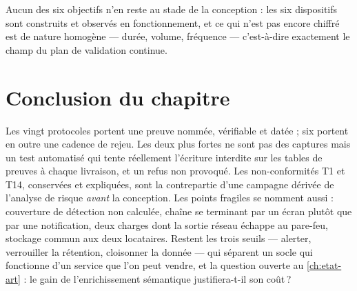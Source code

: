Aucun des six objectifs n'en reste au stade de la conception : les six dispositifs sont construits
et observés en fonctionnement, et ce qui n'est pas encore chiffré est de nature homogène --- durée,
volume, fréquence --- c'est-à-dire exactement le champ du plan de validation continue.

\section*{Conclusion du chapitre}

Les vingt protocoles portent une preuve nommée, vérifiable et datée ; six portent en outre une
cadence de rejeu. Les deux plus fortes ne sont pas des captures mais un test automatisé qui tente
réellement l'écriture interdite sur les tables de preuves à chaque livraison, et un refus non
provoqué. Les non-conformités T1 et T14, conservées et expliquées, sont la contrepartie d'une
campagne dérivée de l'analyse de risque \emph{avant} la conception. Les points fragiles se nomment
aussi : couverture de détection non calculée, chaîne se terminant par un écran plutôt que par une
notification, deux charges dont la sortie réseau échappe au pare-feu, stockage commun aux deux
locataires. Restent les trois seuils --- alerter, verrouiller la rétention, cloisonner la donnée
--- qui séparent un socle qui fonctionne d'un service que l'on peut vendre, et la question ouverte
au \cref{ch:etat-art} : le gain de l'enrichissement sémantique justifiera-t-il son coût\,?

\setcounter{topnumber}{2}\setcounter{bottomnumber}{1}\setcounter{totalnumber}{3}
\renewcommand{\topfraction}{0.7}\renewcommand{\bottomfraction}{0.3}
\renewcommand{\textfraction}{0.2}\renewcommand{\floatpagefraction}{0.5}
\setlength{\LTpre}{\bigskipamount}\setlength{\LTpost}{\bigskipamount}
